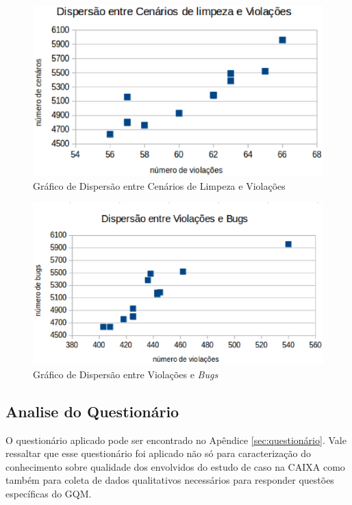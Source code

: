 \begin{figure}[H]
\centering
\includegraphics[keepaspectratio=false,scale=0.7]{figuras/figuras_nilton/dispersaocenariosviolacoes.eps}
\caption{Gráfico de Dispersão entre Cenários de Limpeza e Violações}
\label{dispersaocenariosviolacoes}
\end{figure}

\begin{figure}[H]
\centering
\includegraphics[keepaspectratio=false,scale=0.7]{figuras/figuras_nilton/dispersaoviolacoesbugs.eps}
\caption{Gráfico de Dispersão entre Violações e \textit{Bugs}}
\label{dispersaoviolacoesbugs}
\end{figure}

\subsection{Analise do Questionário}

O questionário aplicado pode ser encontrado no Apêndice \ref{sec:questionário}. Vale ressaltar que esse questionário foi aplicado não só para caracterização do conhecimento sobre qualidade dos envolvidos do estudo de caso na CAIXA como também para coleta de dados qualitativos necessários para responder questões específicas do GQM. 


